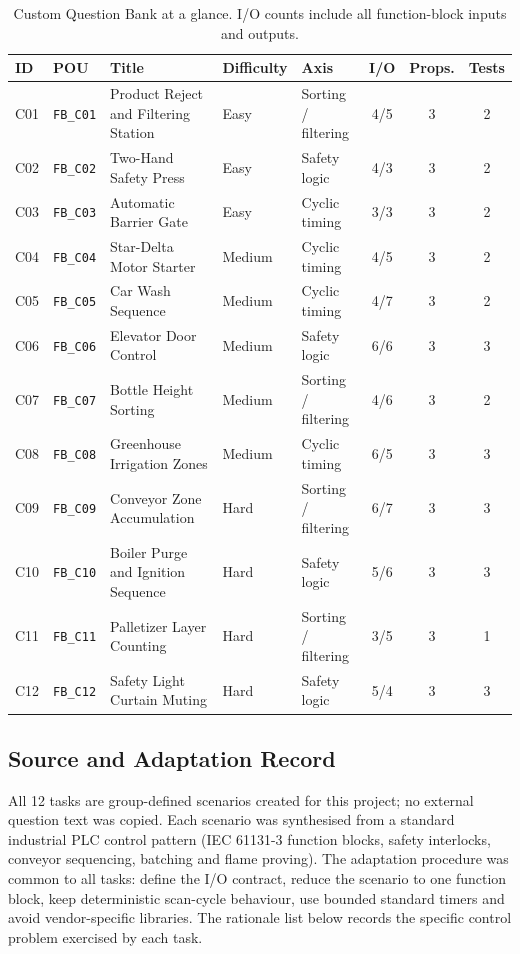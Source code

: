 \begin{table}[htbp]
\centering
\small
\caption{Custom Question Bank at a glance. I/O counts include all function-block inputs and outputs.}
\label{tab:custom_overview}
\begin{tabular}{|l|l|p{}|l|p{}|c|c|c|}
\hline
ID & POU & Title & Difficulty & Axis & I/O & Props. & Tests \\
\hline
C01 & \texttt{FB\_C01} & Product Reject and Filtering Station & Easy & Sorting / filtering & 4/5 & 3 & 2 \\
C02 & \texttt{FB\_C02} & Two-Hand Safety Press & Easy & Safety logic & 4/3 & 3 & 2 \\
C03 & \texttt{FB\_C03} & Automatic Barrier Gate & Easy & Cyclic timing & 3/3 & 3 & 2 \\
C04 & \texttt{FB\_C04} & Star-Delta Motor Starter & Medium & Cyclic timing & 4/5 & 3 & 2 \\
C05 & \texttt{FB\_C05} & Car Wash Sequence & Medium & Cyclic timing & 4/7 & 3 & 2 \\
C06 & \texttt{FB\_C06} & Elevator Door Control & Medium & Safety logic & 6/6 & 3 & 3 \\
C07 & \texttt{FB\_C07} & Bottle Height Sorting & Medium & Sorting / filtering & 4/6 & 3 & 2 \\
C08 & \texttt{FB\_C08} & Greenhouse Irrigation Zones & Medium & Cyclic timing & 6/5 & 3 & 3 \\
C09 & \texttt{FB\_C09} & Conveyor Zone Accumulation & Hard & Sorting / filtering & 6/7 & 3 & 3 \\
C10 & \texttt{FB\_C10} & Boiler Purge and Ignition Sequence & Hard & Safety logic & 5/6 & 3 & 3 \\
C11 & \texttt{FB\_C11} & Palletizer Layer Counting & Hard & Sorting / filtering & 3/5 & 3 & 1 \\
C12 & \texttt{FB\_C12} & Safety Light Curtain Muting & Hard & Safety logic & 5/4 & 3 & 3 \\
\hline
\end{tabular}
\end{table}

\subsection{Source and Adaptation Record}
All 12 tasks are group-defined scenarios created for this project; no external question text was copied. Each scenario was synthesised from a standard industrial PLC control pattern (IEC 61131-3 function blocks, safety interlocks, conveyor sequencing, batching and flame proving). The adaptation procedure was common to all tasks: define the I/O contract, reduce the scenario to one function block, keep deterministic scan-cycle behaviour, use bounded standard timers and avoid vendor-specific libraries. The rationale list below records the specific control problem exercised by each task.

